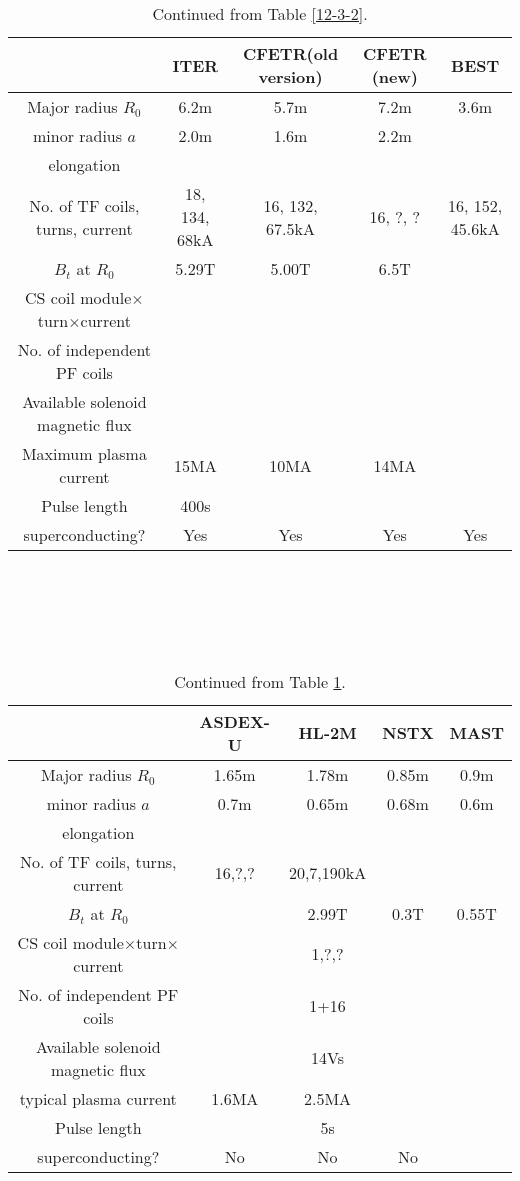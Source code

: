\documentclass{llncs}
\begin{document}
\begin{table}[h]
  \begin{tabular}{|c|c|c|c|c|}
    \hline
    & ITER{\cite{Aymar2002}} & CFETR(old version) & CFETR (new) & BEST\\
    \hline
    Major radius $R_0$ & 6.2m & 5.7m & 7.2m & 3.6m\\
    \hline
    minor radius $a$ & 2.0m & 1.6m & 2.2m & \\
    \hline
    elongation &  &  &  & \\
    \hline
    No. of TF coils, turns, current & 18, 134, 68kA & 16, 132, 67.5kA & 16, ?,
    ? & 16, 152, 45.6kA\\
    \hline
    $B_t$ at $R_0$ & 5.29T & 5.00T & 6.5T & \\
    \hline
    CS coil module$\times$turn$\times$current &  &  &  & \\
    \hline
    No. of independent PF coils &  &  &  & \\
    \hline
    Available solenoid magnetic flux &  &  &  & \\
    \hline
    Maximum plasma current & 15MA & 10MA & 14MA & \\
    \hline
    Pulse length & 400s &  &  & \\
    \hline
    superconducting? & Yes & Yes & Yes & Yes\\
    \hline
  \end{tabular}
  
  \
  \caption{\label{22-1-27-1}Continued from Table \ref{12-3-2}.}
\end{table}

\

\

\begin{table}[h]
  \begin{tabular}{|c|c|c|c|c|}
    \hline
    & ASDEX-U & HL-2M & NSTX & MAST\\
    \hline
    Major radius $R_0$ & 1.65m & 1.78m & 0.85m & 0.9m\\
    \hline
    minor radius $a$ & 0.7m & 0.65m & 0.68m & 0.6m\\
    \hline
    elongation &  &  &  & \\
    \hline
    No. of TF coils, turns, current & 16,?,? & 20,7,190kA &  & \\
    \hline
    $B_t$ at $R_0$ &  & 2.99T & 0.3T & 0.55T\\
    \hline
    CS coil module$\times$turn$\times$current &  & 1,?,? &  & \\
    \hline
    No. of independent PF coils &  & 1+16 &  & \\
    \hline
    Available solenoid magnetic flux &  & 14Vs &  & \\
    \hline
    typical plasma current & 1.6MA & 2.5MA &  & \\
    \hline
    Pulse length &  & 5s &  & \\
    \hline
    superconducting? & No & No & No & \\
    \hline
  \end{tabular}
  
  \
  \caption{Continued from Table \ref{22-1-27-1}.}
\end{table}
\end{document}
